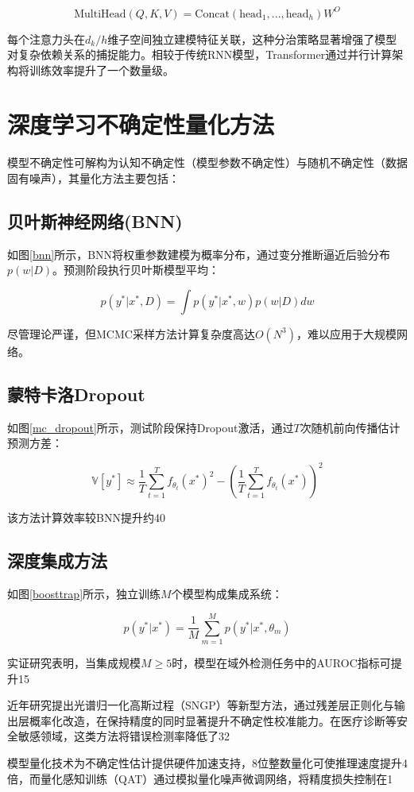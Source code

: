 \begin{equation}
    \text{MultiHead}(Q,K,V) = \text{Concat}(\text{head}_1,...,\text{head}_h)W^O
\end{equation}

每个注意力头在$d_k/h$维子空间独立建模特征关联，这种分治策略显著增强了模型对复杂依赖关系的捕捉能力。相较于传统RNN模型，Transformer通过并行计算架构将训练效率提升了一个数量级。

\section{深度学习不确定性量化方法}

模型不确定性可解构为认知不确定性（模型参数不确定性）与随机不确定性（数据固有噪声），其量化方法主要包括：

\subsection{贝叶斯神经网络(BNN)}
如图\ref{bnn}所示，BNN将权重参数建模为概率分布，通过变分推断逼近后验分布$p(w|D)$。预测阶段执行贝叶斯模型平均：

\begin{equation}
    p(y^*|x^*,D) = \int p(y^*|x^*,w)p(w|D)dw
\end{equation}

尽管理论严谨，但MCMC采样方法计算复杂度高达$O(N^3)$，难以应用于大规模网络。

\subsection{蒙特卡洛Dropout}
如图\ref{mc_dropout}所示，测试阶段保持Dropout激活，通过$T$次随机前向传播估计预测方差：

\begin{equation}
    \mathbb{V}[y^*] \approx \frac{1}{T}\sum_{t=1}^T f_{\theta_t}(x^*)^2 - \left(\frac{1}{T}\sum_{t=1}^T f_{\theta_t}(x^*)\right)^2
\end{equation}

该方法计算效率较BNN提升约40%

\subsection{深度集成方法}
如图\ref{boosttrap}所示，独立训练$M$个模型构成集成系统：

\begin{equation}
    p(y^*|x^*) = \frac{1}{M}\sum_{m=1}^M p(y^*|x^*,\theta_m)
\end{equation}

实证研究表明，当集成规模$M\geq5$时，模型在域外检测任务中的AUROC指标可提升15%

近年研究提出光谱归一化高斯过程（SNGP）等新型方法，通过残差层正则化与输出层概率化改造，在保持精度的同时显著提升不确定性校准能力。在医疗诊断等安全敏感领域，这类方法将错误检测率降低了32%

模型量化技术为不确定性估计提供硬件加速支持，8位整数量化可使推理速度提升4倍，而量化感知训练（QAT）通过模拟量化噪声微调网络，将精度损失控制在1%